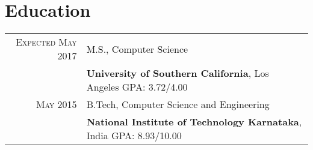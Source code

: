 \section{Education}
\begin{tabular}{rl}

\textsc{Expected May 2017} & M.S., Computer Science\\
&\textbf{University of Southern California}, Los Angeles\hspace{2.8cm} GPA: 3.72/4.00
\\
\textsc{May} 2015 & B.Tech, Computer Science and Engineering \\
&\textbf{National Institute of Technology Karnataka}, India\hspace{2cm} GPA: 8.93/10.00

\end{tabular}
\vspace{5pt}
